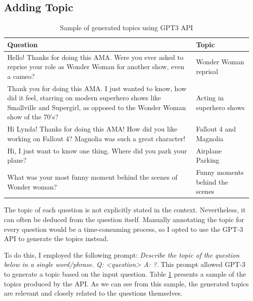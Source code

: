 \documentclass[paper=a4, fontsize=11pt]{scrartcl}
\numberwithin{equation}{section}		%
\numberwithin{figure}{section}			%
\numberwithin{table}{section}				%
\begin{document}
\subsection*{Adding Topic}
\begin{table}
\centering
\scriptsize
\begin{tabular}{m{6cm}m{3cm}}
  \hline
  \textbf{Question} & \textbf{Topic} \\
  \hline
  \hline
  Hello! Thanks for doing this AMA. Were you ever asked to reprise your role as Wonder Woman for another show, even a cameo? &  Wonder Woman reprisal \\
  \hline
Thank you for doing this AMA. I just wanted to know, how did it feel, starring on modern superhero shows like Smallville and Supergirl, as opposed to the Wonder Woman show of the 70's? &  Acting in superhero shows \\
\hline
Hi Lynda! Thanks for doing this AMA! How did you like working on Fallout 4? Magnolia was such a great character! &  Fallout 4 and Magnolia \\
\hline
Hi, I just want to know one thing. Where did you park your plane? &  Airplane Parking \\
\hline
What was your most funny moment behind the scenes of Wonder woman? &  Funny moments behind the scenes \\
  \hline
  \hline
  \end{tabular}
  \caption{Sample of generated topics using GPT3 API}
  \label{tab:topic_sample}
\end{table}

The topic of each question is not explicitly stated in the context. Nevertheless, it can often be deduced from the question itself. Manually annotating the topic for every question would be a time-consuming process, so I opted to use the GPT-3 API to generate the topics instead.

To do this, I employed the following prompt: \textit{Describe the topic of the question below in a single word/phrase. Q: <question> A: ?}. This prompt allowed GPT-3 to generate a topic based on the input question. Table \ref{tab:topic_sample} presents a sample of the topics produced by the API. As we can see from this sample, the generated topics are relevant and closely related to the questions themselves.
\end{document}
